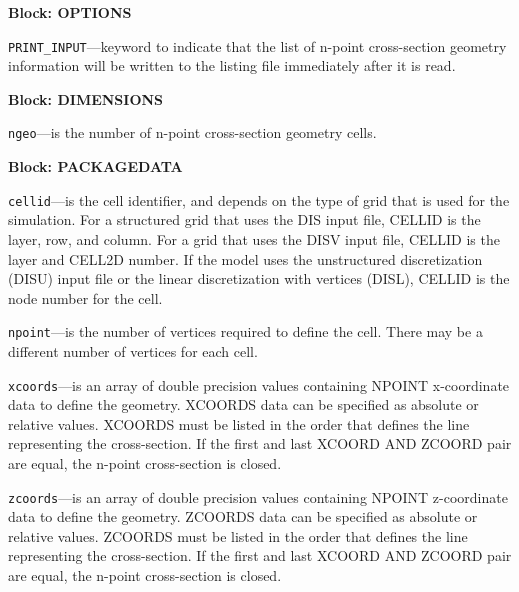 
\item \textbf{Block: OPTIONS}

\begin{description}
\item \texttt{PRINT\_INPUT}---keyword to indicate that the list of n-point cross-section geometry information will be written to the listing file immediately after it is read.

\end{description}
\item \textbf{Block: DIMENSIONS}

\begin{description}
\item \texttt{ngeo}---is the number of n-point cross-section geometry cells.

\end{description}
\item \textbf{Block: PACKAGEDATA}

\begin{description}
\item \texttt{cellid}---is the cell identifier, and depends on the type of grid that is used for the simulation.  For a structured grid that uses the DIS input file, CELLID is the layer, row, and column.   For a grid that uses the DISV input file, CELLID is the layer and CELL2D number.  If the model uses the unstructured discretization (DISU) input file or the linear discretization with vertices (DISL), CELLID is the node number for the cell.

\item \texttt{npoint}---is the number of vertices required to define the cell.  There may be a different number of vertices for each cell.

\item \texttt{xcoords}---is an array of double precision values containing NPOINT x-coordinate data to define the geometry.  XCOORDS data can be specified as absolute or relative values. XCOORDS must be listed in the order that defines the line representing the cross-section. If the first and last XCOORD AND ZCOORD pair are equal, the n-point cross-section is closed.

\item \texttt{zcoords}---is an array of double precision values containing NPOINT z-coordinate data to define the geometry.  ZCOORDS data can be specified as absolute or relative values. ZCOORDS must be listed in the order that defines the line representing the cross-section. If the first and last XCOORD AND ZCOORD pair are equal, the n-point cross-section is closed.

\end{description}


